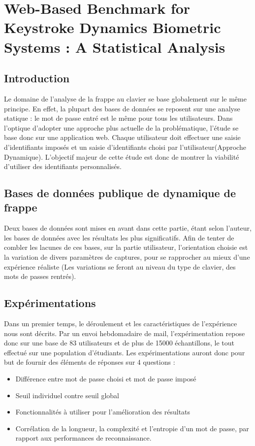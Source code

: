 \section{Web-Based Benchmark for Keystroke Dynamics Biometric Systems : A Statistical Analysis\cite{giotWeb}}

\subsection{Introduction}

Le domaine de l'analyse de la frappe au clavier se base globalement sur le même principe.
En effet, la plupart des bases de données se reposent sur une analyse statique : le mot de passe entré est le même pour tous les utilisateurs. 
Dans l'optique d'adopter une approche plus actuelle de la problématique, l'étude se base donc sur une application web. Chaque utilisateur doit effectuer une saisie d'identifiants imposés et un saisie d'identifiants choisi par l'utilisateur(Approche Dynamique). L'objectif majeur de cette étude est donc de montrer la viabilité d'utiliser des identifiants personnalisés.

\subsection{Bases de données publique de dynamique de frappe}
 
	Deux bases de données sont mises en avant dans cette partie, étant selon l'auteur, les bases de données avec les résultats les plus significatifs. Afin de tenter de combler les lacunes de ces bases, sur la partie utilisateur, l'orientation choisie est la variation de divers paramètres de captures, pour se rapprocher au mieux d'une expérience réaliste (Les variations se feront au niveau du type de clavier, des mots de passes rentrés).

\subsection{Expérimentations}

	Dans un premier temps, le déroulement et les caractéristiques de l'expérience nous sont décrits. Par un envoi hebdomadaire de mail, l'expérimentation repose donc sur une base de 83 utilisateurs  et de plus de 15000 échantillons, le tout effectué sur une population d'étudiants. Les expérimentations auront donc pour but de fournir des éléments de réponses sur 4 questions :

\begin{itemize}
\item Différence entre mot de passe choisi et mot de passe imposé 
\item Seuil individuel contre seuil global 
\item Fonctionnalités à utiliser pour l'amélioration des résultats
\item Corrélation de la longueur, la complexité et l'entropie d'un mot de passe, par rapport aux performances de reconnaissance.
\end{itemize}

